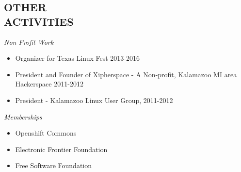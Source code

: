 \documentclass[margin]{res}
\begin{document}
\begin{resume}
\section{OTHER \\ ACTIVITIES} 
		{\sl Non-Profit Work} 
		\begin{itemize} \itemsep -2pt
		\item Organizer for Texas Linux Fest 2013-2016 
		\item President and Founder of Xipherspace - A Non-profit, Kalamazoo MI area Hackerspace 2011-2012
		\item President - Kalamazoo Linux User Group, 2011-2012
		\end{itemize}
		{\sl Memberships} 
		\begin{itemize} \itemsep -2pt
		\item Openshift Commons
		\item Electronic Frontier Foundation
		\item Free Software Foundation
		\end{itemize}
	     
\end{resume}
\end{document}

